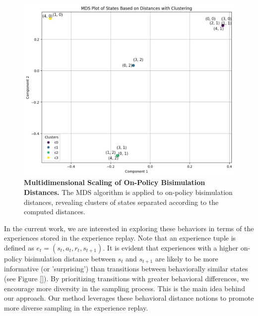 \begin{figure}[h]
    \centering
    \includegraphics[width=0.9\linewidth]{Figures/clustering.jpg}
    \caption[Multidimensional Scaling of On-policy Bisimulation Distances]{\textbf{Multidimensional Scaling of On-Policy Bisimulation Distances.} The MDS algorithm is applied to on-policy bisimulation distances, revealing clusters of states separated according to the computed distances.}
    \label{fig:clustering}
\end{figure}



In the current work, we are interested in exploring these behaviors in terms of the experiences stored in the experience replay. Note that an experience tuple is defined as \(e_t = (s_t, a_t, r_t, s_{t+1})\). It is evident that experiences with a higher on-policy bisimulation distance between \(s_t\) and \(s_{t+1}\) are likely to be more informative (or 'surprising') than transitions between behaviorally similar states (see Figure \ref{}). By prioritizing transitions with greater behavioral differences, we encourage more diversity in the sampling process. This is the main idea behind our approach. Our method leverages these behavioral distance notions to promote more diverse sampling in the experience replay.

